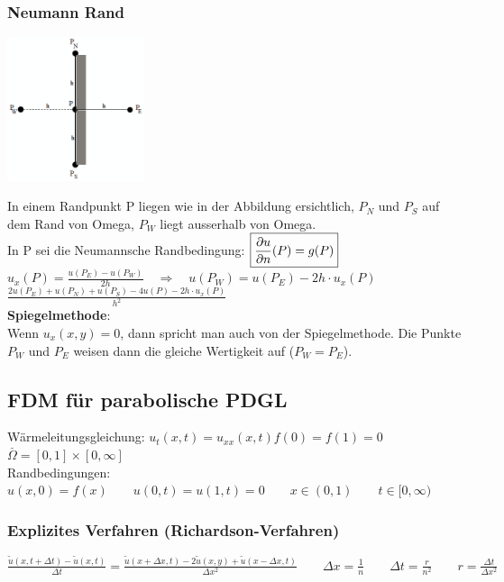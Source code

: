 \subsubsection{Neumann Rand 
}
\begin{minipage}{4cm}
	\includegraphics[width=4cm]{Content/Numerik/NeumannRand.png}
\end{minipage}
\hfill
\begin{minipage}{14cm}
In einem Randpunkt P liegen wie in der Abbildung ersichtlich, $P_N$ und $P_S$ auf dem Rand von Omega, $P_W$ liegt ausserhalb von Omega.\\
In P sei die Neumannsche Randbedingung: $\boxed{\frac{\partial u}{\partial n}(P)=g(P)}$\\
$u_x(P)=\frac{u(P_E)-u(P_W)}{2h}\quad\Rightarrow\quad u(P_W)=u(P_E)-2h\cdot u_x(P)$\\

$\boxed{\frac{2u(P_E) + u(P_N) +
u(P_S)- 4 u(P) - 2h\cdot u_x(P)}{h^2}}$\\


\textbf{Spiegelmethode}:\\
Wenn $u_x(x,y) = 0$, dann spricht man auch von der Spiegelmethode. Die Punkte $P_W$ und $P_E$ weisen dann die gleiche Wertigkeit auf ($P_W=P_E$).
\end{minipage}


\subsection{FDM für parabolische PDGL}
	Wärmeleitungsgleichung: $\boxed{u_t(x,t)=u_{xx}(x,t)}$\qquad $f(0)=f(1)=0$ \qquad$ \overset{\_}{\Omega}=[0,1]\times [0,\infty]$\\
	
	Randbedingungen: $u(x,0)=f(x) \qquad u(0,t)=u(1,t)=0\qquad x\in(0,1) \qquad t\in[0,\infty)$
\subsubsection{Explizites Verfahren (Richardson-Verfahren)}
$\boxed{\frac{\tilde{u}(x,t+\Delta t) - \tilde{u}(x,t)}{\Delta t} = 
\frac{\tilde{u}(x+\Delta x, t)-2\tilde{u}(x,y) + \tilde{u}( x - \Delta x, t )} {\Delta x^2}} \qquad \Delta x=\frac{1}{n} \qquad \Delta t=\frac{r}{n^2} \qquad \boxed{r=\frac{\Delta
t}{\Delta x^2}}$\\

